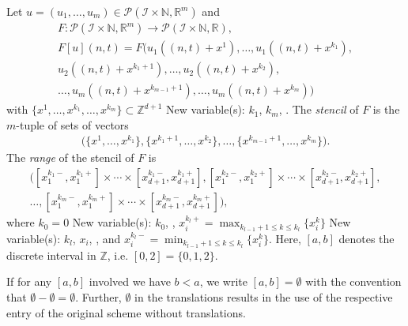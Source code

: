 \documentclass[runningheads]{llncs}
\newcommand{\1}{\chi}
\begin{document}
\begin{definition}
	Let \(u=(u_1,\ldots,u_m)\in\mathcal{P}(\mathcal{I}\times\mathbb{N},\mathbb{R}^m)\) and
	\begin{gather*}
		F:
		\mathcal{P}(\mathcal{I}\times\mathbb{N},\mathbb{R}^m)\rightarrow\mathcal{P}(\mathcal{I}\times\mathbb{N},\mathbb{R}),\\
		F[u](n,t)=F(u_1((n,t)+x^1),\ldots,u_1((n,t)+x^{k_1}),\\
		u_2((n,t)+x^{k_1+1}),
		\ldots,u_2((n,t)+x^{k_2}),\\
		\ldots,
		u_m((n,t)+x^{k_{m-1}+1}),\ldots,u_m((n,t)+x^{k_m}))
	\end{gather*}
	\normalsize
	with \(\{x^1,\ldots,x^{k_1},\ldots,x^{k_m}\}\subset{\mathbb{Z}}^{d+1}\)
{\color{blue} New variable(s): \(k_1\), \(k_m\),  }
.
	The \emph{stencil} of \(F\) is the \(m\)-tuple of sets of vectors
	\begin{gather*}
		\Big(\big\{x^1,\ldots,x^{k_1}\big\},
		\big\{x^{k_1+1},\ldots,x^{k_2}\big\},
		\ldots,
		\big\{x^{k_{m-1}+1},\ldots,x^{k_m}\big\}\Big).
	\end{gather*}
	The \emph{range} of the stencil of \(F\) is
	\begin{gather*}
		\Big([x_1^{k_1 -},x_1^{k_1 +}]\times\cdots\times[x_{d+1}^{k_1 -},x_{d+1}^{k_1 +}],
		[x_1^{k_2 -},x_1^{k_2 +}]\times\cdots\times[x_{d+1}^{k_2 -},x_{d+1}^{k_2 +}],
		\\	\dots,
		[x_1^{k_m -},x_1^{k_m +}]\times\cdots\times[x_{d+1}^{k_m -},x_{d+1}^{k_m +}]
		\Big),
	\end{gather*}
	where \(k_0=0\)
{\color{blue} New variable(s): \(k_0\),  }
, \(x^{k_l +}_i = \max_{k_{l-1}+1\leq k\leq k_l}\{x_i^k\}\)
{\color{blue} New variable(s): \(k_l\), \(x_i\),  }
,
	and \(x^{k_l -}_i = \min_{k_{l-1}+1\leq k\leq k_l}\{x_i^k\}\). Here, \([a,b]\) denotes the discrete interval in \({\mathbb{Z}}\), i.e. \([0,2]=\{0,1,2\}\).
\end{definition}
If for any \([a,b]\) involved we have \(b<a\), we write \([a,b]=\emptyset\) with the convention that \(\emptyset-\emptyset=\emptyset\).  Further, \(\emptyset\) in the translations results in the use of the respective entry of the original scheme without translations.
\end{document}
